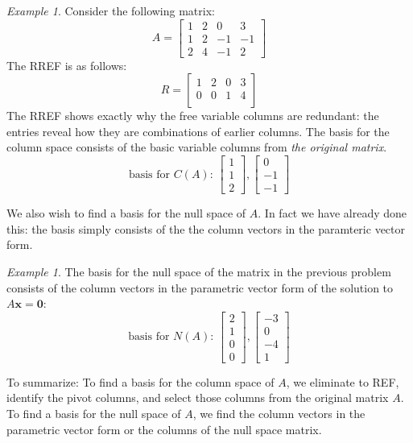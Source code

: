 \documentclass[11pt,oneside]{amsbook}
\theoremstyle{definition}
\theoremstyle{plain}
\theoremstyle{definition}
\theoremstyle{remark}
\newtheorem{example}[theorem]{Example}
\numberwithin{equation}{section}
\numberwithin{figure}{section}
\begin{document}
\begin{example}
  Consider the following matrix:
  \[A=\begin{bmatrix}1&2&0&3\\1&2&-1&-1\\2&4&-1&2\end{bmatrix}
  \]
  The RREF is as follows:
  \[R=\begin{bmatrix}1&2&0&3\\0&0&1&4\\&&&\end{bmatrix}
  \]
  The RREF shows exactly why the free variable columns are redundant: the entries reveal how they are combinations of earlier columns. The basis for the column space consists of the basic variable columns from \emph{the original matrix}.
  \[\text{basis for $C(A)$: }\begin{bmatrix}1\\1\\2\end{bmatrix},
  \begin{bmatrix}0\\-1\\-1\end{bmatrix}
  \]
\end{example}

We also wish to find a basis for the null space of $A$. In fact we have already done this: the basis simply consists of the the column vectors in the paramteric vector form.

\begin{example}
  The basis for the null space of the matrix in the previous problem consists of the column vectors in the parametric vector form of the solution to $A\bm{x}=\bm{0}$:
  \[\text{basis for $N(A)$: }\begin{bmatrix}2\\1\\0\\0\end{bmatrix},
  \begin{bmatrix}-3\\0\\-4\\1\end{bmatrix}
  \]
\end{example}

To summarize: To find a basis for the column space of $A$, we eliminate to REF, identify the pivot columns, and select those columns from the original matrix $A$. To find a basis for the null space of $A$, we find the column vectors in the  parametric vector form or the columns of the null space matrix.
\end{document}
